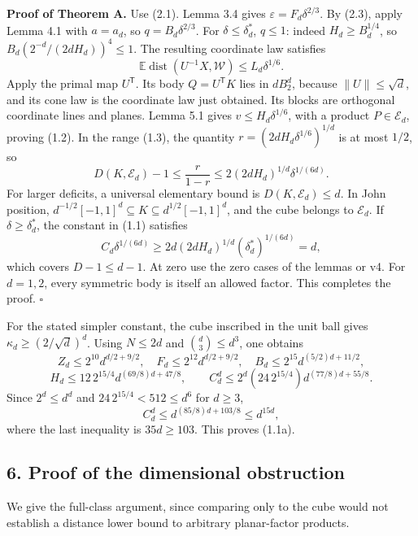 \documentclass[
  11pt,
]{article}
\begin{document}
\textbf{Proof of Theorem A.} Use (2.1). Lemma 3.4 gives
\(\varepsilon=F_d\delta^{2/3}\). By (2.3), apply Lemma 4.1 with
\(a=a_d\), so \(q=B_d\delta^{2/3}\). For \(\delta\le\delta_d^*\),
\(q\le1\): indeed \(H_d\ge B_d^{1/4}\), so
\(B_d(2^{-d}/(2dH_d))^4\le1\). The resulting coordinate law satisfies \[
 \mathbb E\operatorname{dist}(U^{-1}X,\mathcal W)
 \le L_d\delta^{1/6}.
\] Apply the primal map \(U^{\mathsf T}\). Its body \(Q=U^{\mathsf T}K\)
lies in \(dB_2^d\), because \(\|U\|\le\sqrt d\), and its cone law is the
coordinate law just obtained. Its blocks are orthogonal coordinate lines
and planes. Lemma 5.1 gives \(v\le H_d\delta^{1/6}\), with a product
\(P\in\mathcal E_d\), proving (1.2). In the range (1.3), the quantity
\(r=(2dH_d\delta^{1/6})^{1/d}\) is at most \(1/2\), so \[
 D(K,\mathcal E_d)-1\le\frac r{1-r}
 \le2(2dH_d)^{1/d}\delta^{1/(6d)}.
\] For larger deficits, a universal elementary bound is
\(D(K,\mathcal E_d)\le d\). In John position,
\(d^{-1/2}[-1,1]^d\subseteq K\subseteq d^{1/2}[-1,1]^d\), and the cube
belongs to \(\mathcal E_d\). If \(\delta\ge\delta_d^*\), the constant in
(1.1) satisfies \[
 C_d\delta^{1/(6d)}\ge
 2d(2dH_d)^{1/d}(\delta_d^*)^{1/(6d)}=d,
\] which covers \(D-1\le d-1\). At zero use the zero cases of the lemmas
or v4. For \(d=1,2\), every symmetric body is itself an allowed factor.
This completes the proof. \(\square\)

For the stated simpler constant, the cube inscribed in the unit ball
gives \(\kappa_d\ge(2/\sqrt d)^d\). Using \(N\le2d\) and
\(\binom d3\le d^3\), one obtains \[
 Z_d\le2^{10}d^{d/2+9/2},\quad
 F_d\le2^{12}d^{d/2+9/2},\quad
 B_d\le2^{15}d^{(5/2)d+11/2},
\] \[
 H_d\le12\,2^{15/4}d^{(69/8)d+47/8},\qquad
 C_d^d\le2^d(24\,2^{15/4})d^{(77/8)d+55/8}.
\] Since \(2^d\le d^d\) and \(24\,2^{15/4}<512\le d^6\) for \(d\ge3\),
\[
 C_d^d\le d^{(85/8)d+103/8}\le d^{15d},
\] where the last inequality is \(35d\ge103\). This proves (1.1a).

\subsection{6. Proof of the dimensional
obstruction}\label{proof-of-the-dimensional-obstruction}

We give the full-class argument, since comparing only to the cube would
not establish a distance lower bound to arbitrary planar-factor
products.
\end{document}
